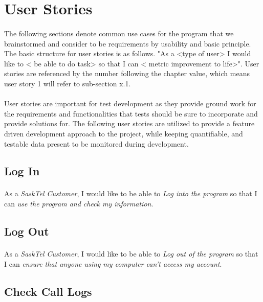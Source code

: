 \documentclass[12pt]{article}
\begin{document}
\section{User Stories}
\paragraph{}	The following sections denote common use cases for the program that we brainstormed and consider to be requirements by usability and basic principle. The basic structure for user stories is as follows. "As a <type of user> I would like to < be able to do task> so that I can < metric improvement to life>". User stories are referenced by the number following the chapter value, which means user story 1 will refer to sub-section x.1.

\paragraph{}	User stories are important for test development as they provide ground work for the requirements and functionalities that tests should be sure to incorporate and provide solutions for. The following user stories are utilized to provide a feature driven development approach to the project, while keeping quantifiable, and testable data present to be monitored during development. 

\subsection{Log In}
\paragraph{}	As a \textit{SaskTel Customer}, I would like to be able to \textit{Log into the program} so that I can \textit{use the program and check my information}.

\subsection{Log Out}
\paragraph{}	As a \textit{SaskTel Customer}, I would like to be able to \textit{Log out of the program} so that I can \textit{ensure that anyone using my computer can't access my account}.

\subsection{Check Call Logs}
\end{document}
